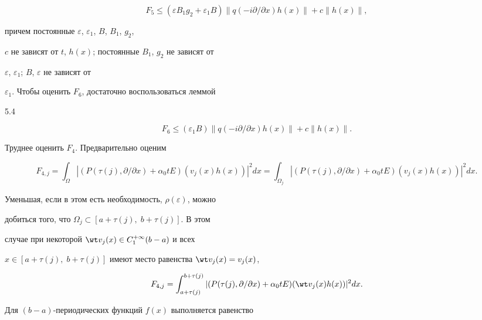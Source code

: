 \begin{equation} 


F_5\le(\varepsilon B_1g_2+\varepsilon_1B)\| 


q(-i\partial/\partial x)h(x)\|+c\|h(x)\|, 


\end{equation} 


причем постоянные $\varepsilon$, $\varepsilon_1$, $B$, $B_1$, $g_2$, 


$c$ не зависят от $t$, $h(x)$; постоянные $B_1$, $g_2$ не зависят от 


$\varepsilon$, $\varepsilon_1$; $B$, $\varepsilon$ не зависят от


$\varepsilon_1$. Чтобы оценить $F_6$, достаточно воспользоваться леммой 


5.4 


\begin{equation} 


F_6\le(\varepsilon_1B)\|q(-i\partial/\partial x)h(x)\|+c\|h(x)\|. 


\end{equation} 


 


Труднее оценить $F_4$. Предварительно оценим 


$$


F_{4,j}=\int_\Omega|(P(\tau(j),\partial/\partial x)+ 


\alpha_0t E)(v_j(x)h(x))|^2dx =


\int_{\Omega_j}|(P(\tau(j),\partial/\partial x)+ 


\alpha_0t E)(v_j(x)h(x))|^2dx. 


$$


Уменьшая, если в этом есть необходимость, $\rho(\varepsilon)$, можно 


добиться того, что $\Omega_j\subset[a+\tau(j),\;b+\tau(j)]$. В этом 


случае при некоторой $\wt v_j(x)\in C^{+\infty}_1(b-a)$ и всех 


$x\in[a+\tau(j),\;b+\tau(j)]$ имеют место равенства $\wt 


v_j(x)=v_j(x)$, 


$$ 


F_{4,j}=\int^{b+\tau(j)}_{a+\tau(j)} 


|(P(\tau(j),\partial/\partial x)+\alpha_0t E) 


(\wt v_j(x)h(x))|^2dx. 


$$ 


Для $(b{-}a)$-периодических функций $f(x)$ выполняется равенство 


